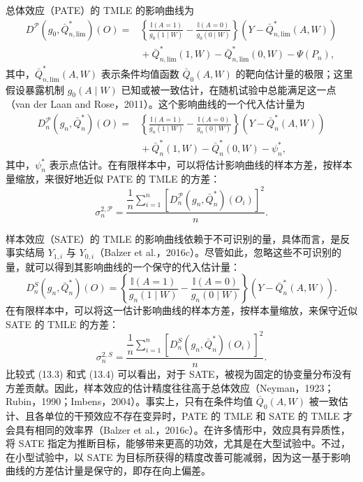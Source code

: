 总体效应（PATE）的 TMLE 的影响曲线为
\[
 \begin{aligned}
 D^{\mathcal P}(g_0,\bar Q_{n,\mathrm{lim}}^*)(O)
 ={}&\left\{\frac{\mathbb I(A=1)}{g_0(1\mid W)}
            -\frac{\mathbb I(A=0)}{g_0(0\mid W)}\right\}
       (Y-\bar Q_{n,\mathrm{lim}}^*(A,W))\\
    &{}+\bar Q_{n,\mathrm{lim}}^*(1,W)
       -\bar Q_{n,\mathrm{lim}}^*(0,W)-\Psi(P_n),
 \end{aligned}
\]
其中，$\bar Q_{n,\mathrm{lim}}^*(A,W)$ 表示条件均值函数 $\bar Q_0(A,W)$ 的靶向估计量的极限；这里假设暴露机制 $g_0(A\mid W)$ 已知或被一致估计，在随机试验中总能满足这一点（van der Laan and Rose，2011）。这个影响曲线的一个代入估计量为
\begin{equation}
 \begin{aligned}
 D_n^{\mathcal P}(g_n,\bar Q_n^*)(O)
 ={}&\left\{\frac{\mathbb I(A=1)}{g_n(1\mid W)}
            -\frac{\mathbb I(A=0)}{g_n(0\mid W)}\right\}
       (Y-\bar Q_n^*(A,W))\\
    &{}+\bar Q_n^*(1,W)-\bar Q_n^*(0,W)-\psi_n^*,
 \end{aligned}
 \tag{13.3}
\end{equation}
其中，$\psi_n^*$ 表示点估计。在有限样本中，可以将估计影响曲线的样本方差，按样本量缩放，来很好地近似 PATE 的 TMLE 的方差：
\[
 \sigma_n^{2,\mathcal P}
 =\frac{\dfrac1n\displaystyle\sum_{i=1}^n
       [D_n^{\mathcal P}(g_n,\bar Q_n^*)(O_i)]^2}{n}.
\]

样本效应（SATE）的 TMLE 的影响曲线依赖于不可识别的量，具体而言，是反事实结局 $Y_{1,i}$ 与 $Y_{0,i}$（Balzer et al.，2016c）。尽管如此，忽略这些不可识别的量，就可以得到其影响曲线的一个保守的代入估计量：
\begin{equation}
 D_n^S(g_n,\bar Q_n^*)(O)
 =\left\{\frac{\mathbb I(A=1)}{g_n(1\mid W)}
         -\frac{\mathbb I(A=0)}{g_n(0\mid W)}\right\}
   (Y-\bar Q_n^*(A,W)).
 \tag{13.4}
\end{equation}
在有限样本中，可以将这一估计影响曲线的样本方差，按样本量缩放，来保守近似 SATE 的 TMLE 的方差：
\[
 \sigma_n^{2,S}
 =\frac{\dfrac1n\displaystyle\sum_{i=1}^n
       [D_n^S(g_n,\bar Q_n^*)(O_i)]^2}{n}.
\]
比较式 (13.3) 和式 (13.4) 可以看出，对于 SATE，被视为固定的协变量分布没有方差贡献。因此，样本效应的估计精度往往高于总体效应（Neyman，1923；Rubin，1990；Imbens，2004）。事实上，只有在条件均值 $\bar Q_0(A,W)$ 被一致估计、且各单位的干预效应不存在变异时，PATE 的 TMLE 和 SATE 的 TMLE 才会具有相同的效率界（Balzer et al.，2016c）。在许多情形中，效应具有异质性，将 SATE 指定为推断目标，能够带来更高的功效，尤其是在大型试验中。不过，在小型试验中，以 SATE 为目标所获得的精度改善可能减弱，因为这一基于影响曲线的方差估计量是保守的，即存在向上偏差。

